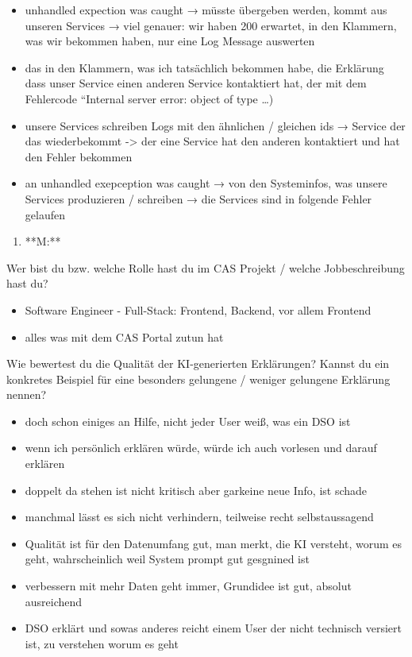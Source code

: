 \documentclass[
  a4paper,
  12pt,
  oneside,
  open=any,
  BCOR=12mm,
  DIV=14,
  parskip=half*,
  headsepline,
  footsepline,
  pointlessnumbers,
  liststotoc,
  numbers=noenddot,
  listof=totoc]{scrartcl}
\providecommand{\tightlist}{%
  \setlength{\itemsep}{0pt}\setlength{\parskip}{0pt}}\usepackage{longtable,booktabs,array}
\begin{document}
\begin{itemize}
\tightlist
\item
  unhandled expection was caught → müsste übergeben werden, kommt aus
  unseren Services → viel genauer: wir haben 200 erwartet, in den
  Klammern, was wir bekommen haben, nur eine Log Message auswerten
\item
  das in den Klammern, was ich tatsächlich bekommen habe, die Erklärung
  dass unser Service einen anderen Service kontaktiert hat, der mit dem
  Fehlercode ``Internal server error: object of type \ldots)
\item
  unsere Services schreiben Logs mit den ähnlichen / gleichen ids →
  Service der das wiederbekommt -\textgreater{} der eine Service hat den
  anderen kontaktiert und hat den Fehler bekommen
\item
  an unhandled exepception was caught → von den Systeminfos, was unsere
  Services produzieren / schreiben → die Services sind in folgende
  Fehler gelaufen
\end{itemize}

\begin{enumerate}
\def\labelenumi{\arabic{enumi}.}
\tightlist
\item
  **M:**
\end{enumerate}

Wer bist du bzw. welche Rolle hast du im CAS Projekt / welche
Jobbeschreibung hast du?

\begin{itemize}
\tightlist
\item
  Software Engineer - Full-Stack: Frontend, Backend, vor allem Frontend
\item
  alles was mit dem CAS Portal zutun hat
\end{itemize}

Wie bewertest du die Qualität der KI-generierten Erklärungen? Kannst du
ein konkretes Beispiel für eine besonders gelungene / weniger gelungene
Erklärung nennen?

\begin{itemize}
\tightlist
\item
  doch schon einiges an Hilfe, nicht jeder User weiß, was ein DSO ist
\item
  wenn ich persönlich erklären würde, würde ich auch vorlesen und darauf
  erklären
\item
  doppelt da stehen ist nicht kritisch aber garkeine neue Info, ist
  schade
\item
  manchmal lässt es sich nicht verhindern, teilweise recht
  selbstaussagend
\item
  Qualität ist für den Datenumfang gut, man merkt, die KI versteht,
  worum es geht, wahrscheinlich weil System prompt gut gesgnined ist
\item
  verbessern mit mehr Daten geht immer, Grundidee ist gut, absolut
  ausreichend
\item
  DSO erklärt und sowas anderes reicht einem User der nicht technisch
  versiert ist, zu verstehen worum es geht
\end{itemize}
\end{document}
